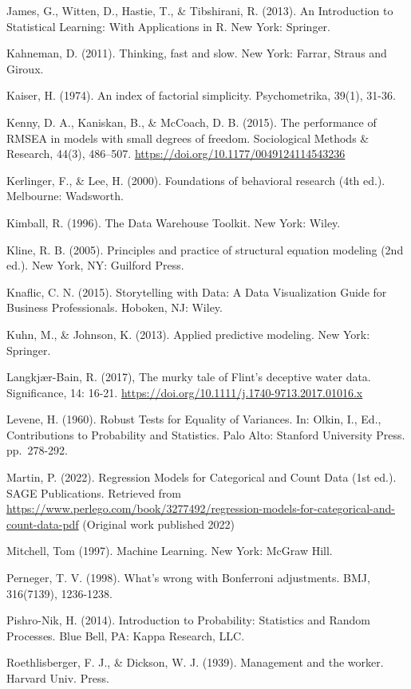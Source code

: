 \documentclass[
]{book}
\begin{document}
James, G., Witten, D., Hastie, T., \& Tibshirani, R. (2013). An Introduction to Statistical Learning: With Applications in R. New York: Springer.

Kahneman, D. (2011). Thinking, fast and slow. New York: Farrar, Straus and Giroux.

Kaiser, H. (1974). An index of factorial simplicity. Psychometrika, 39(1), 31-36.

Kenny, D. A., Kaniskan, B., \& McCoach, D. B. (2015). The performance of RMSEA in models with small degrees of freedom. Sociological Methods \& Research, 44(3), 486--507. \url{https://doi.org/10.1177/0049124114543236}

Kerlinger, F., \& Lee, H. (2000). Foundations of behavioral research (4th ed.). Melbourne: Wadsworth.

Kimball, R. (1996). The Data Warehouse Toolkit. New York: Wiley.

Kline, R. B. (2005). Principles and practice of structural equation modeling (2nd ed.). New York, NY: Guilford Press.

Knaflic, C. N. (2015). Storytelling with Data: A Data Visualization Guide for Business Professionals. Hoboken, NJ: Wiley.

Kuhn, M., \& Johnson, K. (2013). Applied predictive modeling. New York: Springer.

Langkjær-Bain, R. (2017), The murky tale of Flint's deceptive water data. Significance, 14: 16-21. \url{https://doi.org/10.1111/j.1740-9713.2017.01016.x}

Levene, H. (1960). Robust Tests for Equality of Variances. In: Olkin, I., Ed., Contributions to Probability and Statistics. Palo Alto: Stanford University Press. pp.~278-292.

Martin, P. (2022). Regression Models for Categorical and Count Data (1st ed.). SAGE Publications. Retrieved from \url{https://www.perlego.com/book/3277492/regression-models-for-categorical-and-count-data-pdf} (Original work published 2022)

Mitchell, Tom (1997). Machine Learning. New York: McGraw Hill.

Perneger, T. V. (1998). What's wrong with Bonferroni adjustments. BMJ, 316(7139), 1236-1238.

Pishro-Nik, H. (2014). Introduction to Probability: Statistics and Random Processes. Blue Bell, PA: Kappa Research, LLC.

Roethlisberger, F. J., \& Dickson, W. J. (1939). Management and the worker. Harvard Univ. Press.
\end{document}

